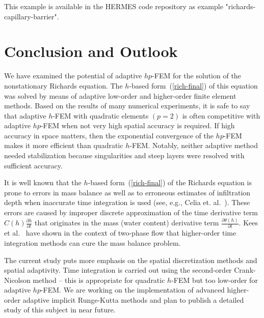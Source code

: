 \documentclass[final,3p,times,twocolumn]{elsarticle}
\begin{document}
This example is available in the HERMES code repository \cite{hermes-repo}
as example "richards-capillary-barrier".



\section{Conclusion and Outlook} \label{sec:8}

We have examined the potential of adaptive $hp$-FEM
for the solution of the nonstationary Richards equation. 
The $h$-based form~(\ref{rich-final}) of this equation 
was solved by means of adaptive low-order 
and higher-order finite element methods. 
Based on the results of many numerical experiments, 
it is safe to say that adaptive $h$-FEM with quadratic elements $(p=2)$
is often competitive with adaptive $hp$-FEM when not very high spatial 
accuracy is required. If high accuracy in space matters, then 
the exponential convergence of the $hp$-FEM makes it more 
efficient than quadratic $h$-FEM. Notably, neither adaptive
method needed stabilization because singularities and steep
layers were resolved with sufficient accuracy.



It is well known that the $h$-based form~(\ref{rich-final}) 
of the Richards equation is prone 
to errors in mass balance as well as to erroneous estimates of 
infiltration depth when inaccurate time integration is used (see, e.g., 
Celia et. al.~\cite{celia}). These errors are caused by improper discrete 
approximation of the time derivative term 
$C(h)\frac{\partial h}{\partial t}$ that originates in the mass (water content) derivative 
term $\frac{\partial \theta(h)}{\partial t}$. Kees et al.~\cite{kees-time-integ} have 
shown in the context of two-phase flow that higher-order time integration methods
can cure the mass balance problem. 

The current study puts more emphasis on the spatial discretization methods 
and spatial adaptivity. Time integration is carried out using the 
second-order Crank-Nicolson method -- this is appropriate for quadratic $h$-FEM
but too low-order for adaptive $hp$-FEM. We are working on the implementation 
of advanced higher-order adaptive implicit Runge-Kutta methods and plan to 
publish a detailed study of this subject in near future.
\end{document}

